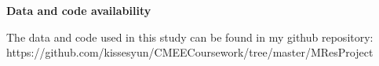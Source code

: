 \cleardoublepage\clearpage

\Large \vspace{1cm}
{\bf Data and code availability} 
\normalsize \vspace{5mm}

The data and code used in this study can be found in my github repository: https://github.com/kissesyun/CMEECoursework/tree/master/MResProject